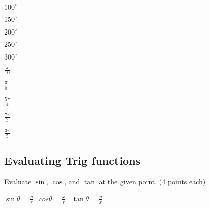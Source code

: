 \documentclass[12pt]{article}
\begin{document}
\begin{enumerate}[resume]
\begin{multicols}{2}

\item $100^\circ$\\

\item $150^\circ$\\

\item $200^\circ$\\

\item $250^\circ$\\

\item $300^\circ$\\

\columnbreak

\item $\frac{\pi}{10}$\\

\item $\frac{\pi}{5}$\\

\item $\frac{5\pi}{4}$\\

\item $\frac{7\pi}{3}$\\

\item $\frac{3\pi}{5}$\\

\end{multicols}
\end{enumerate}


\pagebreak

\subsection*{Evaluating Trig functions}

Evaluate $\sin$, $\cos$, and $\tan$ at the given point. (4 points each)\\

\begin{center}
$\sin\theta=\frac{y}{r}$ \ $cos\theta=\frac{x}{r}$ \ $\tan\theta=\frac{y}{x}$\\
\end{center}

\vspace{12pt}
\end{document}
